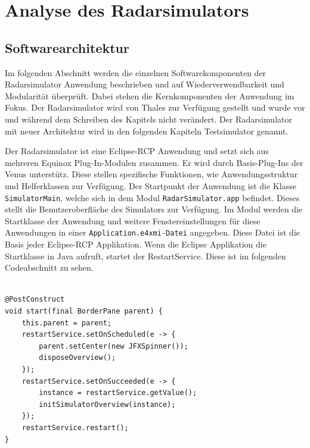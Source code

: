 \section{Analyse des Radarsimulators}

\subsection{Softwarearchitektur}

Im folgenden Abschnitt werden die einzelnen Softwarekomponenten der Radarsimulator Anwendung beschrieben und auf Wiederverwendbarkeit und Modularität überprüft. Dabei stehen die Kernkomponenten der Anwendung im Fokus. Der Radarsimulator wird von Thales zur Verfügung gestellt und wurde vor und während dem Schreiben des Kapitels nicht verändert. Der Radarsimulator mit neuer Architektur wird in den folgenden Kapiteln Testsimulator genannt.

Der Radarsimulator ist eine Eclipse-RCP Anwendung und setzt sich aus mehreren Equinox Plug-In-Modulen zusammen. Er wird durch Basis-Plug-Ins der Venus unterstütz. Diese stellen spezifische Funktionen, wie Anwendungsstruktur und Helferklassen zur Verfügung. Der Startpunkt der Anwendung ist die Klasse \texttt{SimulatorMain}, welche sich in dem Modul \texttt{RadarSimulator.app} befindet. Dieses stellt die Benutzeroberfläche des Simulators zur Verfügung. Im Modul werden die Startklasse der Anwendung und weitere Fenstereinstellungen für diese Anwendungen in einer \texttt{Application.e4xmi-Datei} angegeben. Diese Datei ist die Basis jeder Eclipse-RCP Applikation. Wenn die Eclipse Applikation die Startklasse in Java aufruft, startet der RestartService. Diese ist im folgenden Codeabschnitt zu sehen.


\begin{lstlisting}

@PostConstruct
void start(final BorderPane parent) {
    this.parent = parent;
    restartService.setOnScheduled(e -> {
        parent.setCenter(new JFXSpinner());
        disposeOverview();
    });
    restartService.setOnSucceeded(e -> {
        instance = restartService.getValue();
        initSimulatorOverview(instance);
    });
    restartService.restart();
}

\end{lstlisting}


